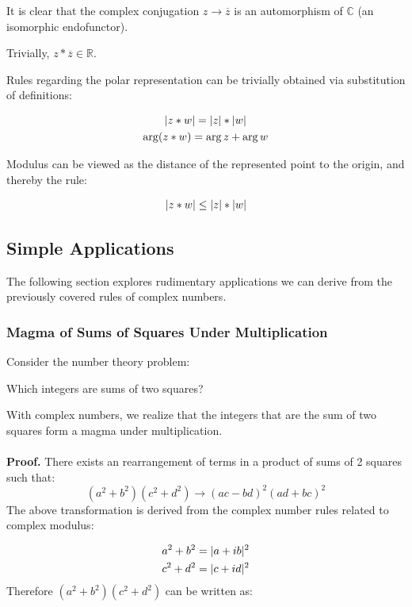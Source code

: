 \documentclass[12pt]{article}
\begin{document}
	It is clear that the complex conjugation $z \to \overline z$ is an automorphism of $\mathbb{C}$ (an isomorphic endofunctor).
	
	Trivially, $z * \overline z \in \mathbb{R}$.
	
	Rules regarding the polar representation can be trivially obtained via substitution of definitions:
	
	\begin{gather*}
		\lvert z * w \rvert = \lvert z \rvert * \lvert w \rvert \\
		\arg(z * w) = \arg z + \arg w
	\end{gather*}
	
	Modulus can be viewed as the distance of the represented point to the origin, and thereby the rule:
	
	\begin{gather*}
		\lvert z * w \rvert \leq \lvert z \rvert * \lvert w \rvert
	\end{gather*}
	
	\subsection{Simple Applications}
	
	The following section explores rudimentary applications we can derive from the previously covered rules of complex numbers.
	
	\subsubsection{Magma of Sums of Squares Under Multiplication}
	
	Consider the number theory problem:
	\begin{center}
		Which integers are sums of two squares?
	\end{center}
	
	With complex numbers, we realize that the integers that are the sum of two squares form a magma under multiplication.
	\\\\
	\textbf{Proof.} There exists an rearrangement of terms in a product of sums of 2 squares such that: $$(a^2 + b^2)(c^2 + d^2) \to (ac - bd)^2 (ad + bc)^2$$
	The above transformation is derived from the complex number rules related to complex modulus:
	
	\begin{gather*}
		a^2 + b^2 = \lvert a + ib \rvert^2 \\
		c^2 + d^2 = \lvert c + id \rvert^2
	\end{gather*}
	Therefore $(a^2 + b^2)(c^2 + d^2)$ can be written as:
	
\end{document}
